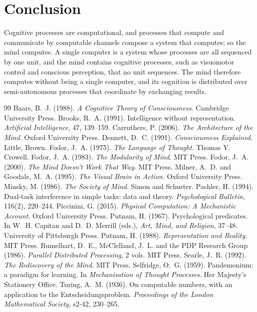 \documentclass{situationist-preprint}
\begin{document}
\section{Conclusion}

Cognitive processes are computational, and processes that compute and communicate by computable channels compose a system that computes; so the mind computes. A single computer is a system whose processes are all sequenced by one unit, and the mind contains cognitive processes, such as visuomotor control and conscious perception, that no unit sequences. The mind therefore computes without being a single computer, and its cognition is distributed over semi-autonomous processes that coordinate by exchanging results.

\begin{thebibliography}{99}\small
{} Baars, B.~J. (1988). \emph{A Cognitive Theory of Consciousness}. Cambridge University Press.
 Brooks, R.~A. (1991). Intelligence without representation. \emph{Artificial Intelligence}, 47, 139--159.
 Carruthers, P. (2006). \emph{The Architecture of the Mind}. Oxford University Press.
 Dennett, D.~C. (1991). \emph{Consciousness Explained}. Little, Brown.
 Fodor, J.~A. (1975). \emph{The Language of Thought}. Thomas Y. Crowell.
 Fodor, J.~A. (1983). \emph{The Modularity of Mind}. MIT Press.
 Fodor, J.~A. (2000). \emph{The Mind Doesn't Work That Way}. MIT Press.
 Milner, A.~D. and Goodale, M.~A. (1995). \emph{The Visual Brain in Action}. Oxford University Press.
 Minsky, M. (1986). \emph{The Society of Mind}. Simon and Schuster.
 Pashler, H. (1994). Dual-task interference in simple tasks: data and theory. \emph{Psychological Bulletin}, 116(2), 220--244.
 Piccinini, G. (2015). \emph{Physical Computation: A Mechanistic Account}. Oxford University Press.
 Putnam, H. (1967). Psychological predicates. In W.~H. Capitan and D.~D. Merrill (eds.), \emph{Art, Mind, and Religion}, 37--48. University of Pittsburgh Press.
 Putnam, H. (1988). \emph{Representation and Reality}. MIT Press.
 Rumelhart, D.~E., McClelland, J.~L. and the PDP Research Group (1986). \emph{Parallel Distributed Processing}, 2 vols. MIT Press.
 Searle, J.~R. (1992). \emph{The Rediscovery of the Mind}. MIT Press.
 Selfridge, O.~G. (1959). Pandemonium: a paradigm for learning. In \emph{Mechanisation of Thought Processes}. Her Majesty's Stationery Office.
 Turing, A.~M. (1936). On computable numbers, with an application to the Entscheidungsproblem. \emph{Proceedings of the London Mathematical Society}, s2-42, 230--265.
\end{thebibliography}
\end{document}
